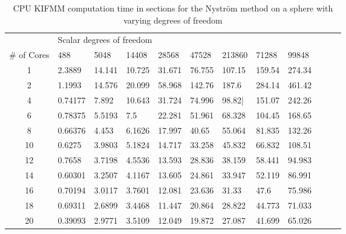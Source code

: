 \begin{table}[ht]
    \centering
    \setlength{\tabcolsep}{6pt}
    \renewcommand{\arraystretch}{1.4}
    \small
    \begin{tabular}{c|lllllllllll}
     & \multicolumn{8}{l}{Scalar degrees of freedom} \\ \cline{2-9}
    \# of Cores & 488 & 5048 & 14408 & 28568 & 47528 & 213860 & 71288 & 99848 \\ \hline
    1 & 2.3889 & 14.141 & 10.725 & 31.671 & 76.755 & 107.15 & 159.54 & 274.34 \\
    2 & 1.1993 & 14.576 & 20.099 & 58.968 & 142.76 & 187.6 & 284.14 & 461.42 \\
    4 & 0.74177 & 7.892 & 10.643 & 31.724 & 74.996 & 98.82| & 151.07 & 242.26 \\
    6 & 0.78375 & 5.5193 & 7.5 & 22.281 & 51.961 & 68.328 & 104.45 & 168.65 \\
    8 & 0.66376 & 4.453 & 6.1626 & 17.997 & 40.65 & 55.064 & 81.835 & 132.26 \\
    10 & 0.6275 & 3.9803 & 5.1824 & 14.717 & 33.258 & 45.832 & 66.832 & 108.51 \\
    12 & 0.7658 & 3.7198 & 4.5536 & 13.593 & 28.836 & 38.159 & 58.441 & 94.983 \\
    14 & 0.60301 & 3.2507 & 4.1167 & 13.605 & 24.861 & 33.947 & 52.119 & 86.991 \\
    16 & 0.70194 & 3.0117 & 3.7601 & 12.081 & 23.636 & 31.33 & 47.6 & 75.986 \\
    18 & 0.69311 & 2.6899 & 3.4468 & 11.447 & 20.864 & 28.822 & 44.773 & 71.033 \\
    20 & 0.39093 & 2.9771 & 3.5109 & 12.049 & 19.872 & 27.087 & 41.699 & 65.026
    \end{tabular}
    \caption{CPU KIFMM computation time in sections for the Nyström method on a sphere with varying degrees of freedom}
    \label{tab:CPUparalisation}
\end{table}

